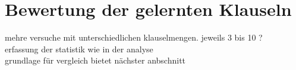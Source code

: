 \chapter{Bewertung der gelernten Klauseln}
\label{chp:bewertung}

mehre versuche mit unterschiedlichen klauselmengen. jeweils 3 bis 10 ?\\
erfassung der statistik wie in der analyse\\
grundlage für vergleich bietet nächster anbschnitt






